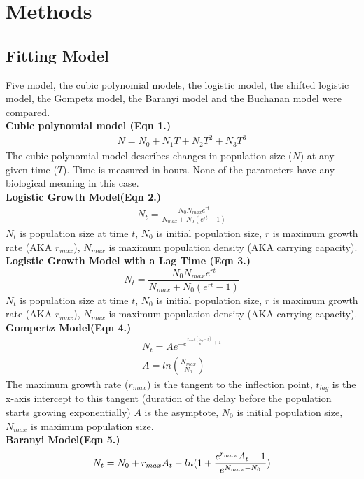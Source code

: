 \documentclass[a4paper,11pt]{article}
\theoremstyle{definition}
\begin{document}
\section{Methods}
\subsection{Fitting Model}
Five model, the cubic polynomial models, the logistic model, the shifted logistic model, the Gompetz model, the Baranyi model and the Buchanan model were compared.\\
\textbf{Cubic polynomial model (Eqn 1.)}
\begin{align}
    N = N_0 + N_1 T + N_2 T^2 + N_3 T^3
\end{align}
The cubic polynomial model describes changes in population size ($N$) at any given time ($T$). Time is measured in hours. None of the parameters have any biological meaning in this case. \\
\textbf{Logistic Growth Model(Eqn 2.)}
\begin{align}
    N_t = \frac{N_0 N_{max} e^{rt}}{N_{max}+N_0(e^{rt}-1)}
\end{align}
$N_t$ is population size at time $t$, $N_0$ is initial population size, $r$ is maximum growth rate (AKA $r_{max}$), $N_{max}$ is maximum population density (AKA carrying capacity).\\
\textbf{Logistic Growth Model with a Lag Time (Eqn 3.)}
\begin{equation}
    N_t = \frac{N_0 N_{max} e^{rt}}{N_{max}+N_0(e^{rt}-1)}
\end{equation}
$N_t$ is population size at time $t$, $N_0$ is initial population size, $r$ is maximum growth rate (AKA $r_{max}$), $N_{max}$ is maximum population density (AKA carrying capacity).\\
\textbf{Gompertz Model(Eqn 4.)}
\begin{align}
    N_t = Ae^{-e^{\frac{r_{max}e(t_{lag}-t)}{A}+1}}\\
    A=ln(\frac{N_{max}}{N_0})
\end{align}
The maximum growth rate ($r_{max}$) is the tangent to the inflection point, $t_{lag}$ is the x-axis intercept to this tangent (duration of the delay before the population starts growing exponentially) $A$ is the asymptote, $N_0$ is initial population size, $N_{max}$ is maximum population size.\\
\textbf{Baranyi Model(Eqn 5.)}
\begin{equation}
    N_t = N_0 + r_{max}A_t - ln(1+\frac{e^{r_{max}}A_t-1}{e^{N_{max}-N_0}})\\
\end{equation}
\end{document}
